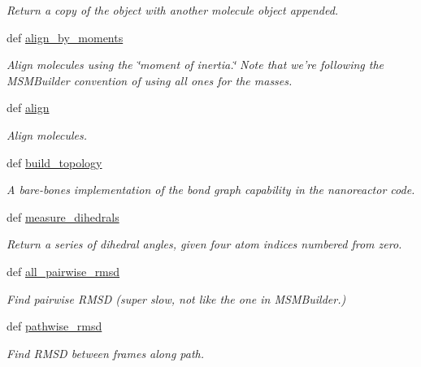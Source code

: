 \begin{DoxyCompactItemize}
\begin{DoxyCompactList}\small\item\em \-Return a copy of the object with another molecule object appended. \end{DoxyCompactList}\item 
def \hyperlink{classforcebalance_1_1molecule_1_1Molecule_a685c8092020a46cd7cf5b52ab45ca6e4}{align\-\_\-by\-\_\-moments}
\begin{DoxyCompactList}\small\item\em \-Align molecules using the \char`\"{}moment of inertia.\char`\"{} \-Note that we're following the \-M\-S\-M\-Builder convention of using all ones for the masses. \end{DoxyCompactList}\item 
def \hyperlink{classforcebalance_1_1molecule_1_1Molecule_a87e66db685214a9cdd4feff49d4ea5dc}{align}
\begin{DoxyCompactList}\small\item\em \-Align molecules. \end{DoxyCompactList}\item 
def \hyperlink{classforcebalance_1_1molecule_1_1Molecule_a071f18dacd881f761462f772bb0cf632}{build\-\_\-topology}
\begin{DoxyCompactList}\small\item\em \-A bare-\/bones implementation of the bond graph capability in the nanoreactor code. \end{DoxyCompactList}\item 
def \hyperlink{classforcebalance_1_1molecule_1_1Molecule_aa6b0a08a6579f697667c83e04927298c}{measure\-\_\-dihedrals}
\begin{DoxyCompactList}\small\item\em \-Return a series of dihedral angles, given four atom indices numbered from zero. \end{DoxyCompactList}\item 
def \hyperlink{classforcebalance_1_1molecule_1_1Molecule_af412b655371674434ec63b4bfea6d8c0}{all\-\_\-pairwise\-\_\-rmsd}
\begin{DoxyCompactList}\small\item\em \-Find pairwise \-R\-M\-S\-D (super slow, not like the one in \-M\-S\-M\-Builder.) \end{DoxyCompactList}\item 
def \hyperlink{classforcebalance_1_1molecule_1_1Molecule_ac0fd89e640485f7216183f9a7601c51f}{pathwise\-\_\-rmsd}
\begin{DoxyCompactList}\small\item\em \-Find \-R\-M\-S\-D between frames along path. \end{DoxyCompactList}\item 

\end{DoxyCompactItemize}
